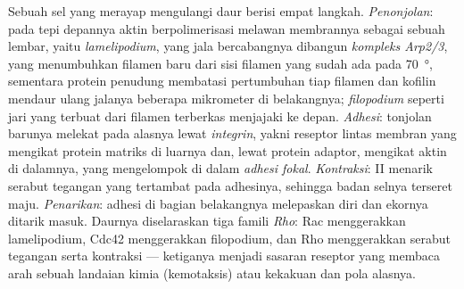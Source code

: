 \begin{definition}\label{def:b3:cytoskeleton-motility:migration}
%
Sebuah sel yang merayap mengulangi daur berisi empat langkah.
\emph{Penonjolan}: pada tepi depannya aktin berpolimerisasi melawan membrannya
sebagai sebuah lembar, yaitu \emph{lamelipodium}, yang jala bercabangnya
dibangun \emph{kompleks Arp2/3}, yang menumbuhkan filamen baru dari sisi
filamen yang sudah ada pada \qty{70}{\degree}, sementara protein penudung
membatasi pertumbuhan tiap filamen dan kofilin mendaur ulang jalanya beberapa
mikrometer di belakangnya; \emph{filopodium} seperti jari yang terbuat dari
filamen terberkas menjajaki ke depan. \emph{Adhesi}: tonjolan barunya melekat
pada alasnya lewat \emph{integrin}, yakni reseptor lintas membran yang mengikat
protein matriks di luarnya dan, lewat protein adaptor, mengikat aktin di
dalamnya, yang mengelompok di dalam \emph{adhesi fokal}. \emph{Kontraksi}:
 II menarik serabut tegangan yang tertambat pada adhesinya, sehingga
badan selnya terseret maju. \emph{Penarikan}: adhesi di bagian belakangnya
melepaskan diri dan ekornya ditarik masuk. Daurnya diselaraskan tiga  famili \emph{Rho}: Rac menggerakkan lamelipodium, Cdc42 menggerakkan
filopodium, dan Rho menggerakkan serabut tegangan serta kontraksi --- ketiganya
menjadi sasaran reseptor yang membaca arah sebuah landaian kimia
(kemotaksis) atau kekakuan dan pola alasnya.
\end{definition}


